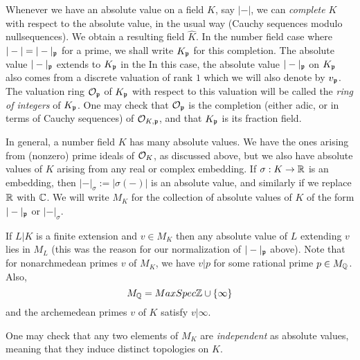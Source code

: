 Whenever we have an absolute value on a field $K$, say $|-|$, we can \emph{complete} $K$ with respect to the absolute value, in the usual way (Cauchy sequences modulo nullsequences).
We obtain a resulting field $\hat K$.
In the number field case where $|-| = |-|_{\mathfrak{p}}$ for a prime, we shall write $K_{\mathfrak{p}}$ for this completion.
The absolute value $|-|_{\mathfrak{p}}$ extends to $K_{\mathfrak{p}}$ in the 
In this case, the absolute value $|-|_{\mathfrak{p}}$ on $K_{\mathfrak{p}}$ also comes from a discrete valuation of rank $1$ which we will also denote by $v_{\mathfrak{p}}$.
The valuation ring $\mathcal{O}_{\mathfrak{p}}$ of $K_{\mathfrak{p}}$ with respect to this valuation will be called the \emph{ring of integers} of $K_{\mathfrak{p}}$.
One may check that $\mathcal{O}_{\mathfrak{p}}$ is the completion (either adic, or in terms of Cauchy sequences) of $\mathcal{O}_{K,\mathfrak{p}}$, and that $K_{\mathfrak{p}}$ is its fraction field.

In general, a number field $K$ has many absolute values.
We have the ones arising from (nonzero) prime ideals of $\mathcal{O}_{K}$, as discussed above, but we also have absolute values of $K$ arising from any real or complex embedding.
If $\sigma : K \to \mathbb{R}$ is an embedding, then $|-|_{\sigma} := |\sigma(-)|$ is an absolute value, and similarly if we replace $\mathbb{R}$ with $\mathbb{C}$.
We will write $M_{K}$ for the collection of absolute values of $K$ of the form $|-|_{\mathfrak{p}}$ or $|-|_{\sigma}$.

If $L|K$ is a finite extension and $v \in M_{K}$ then any absolute value of $L$ extending $v$ lies in $M_{L}$ (this was the reason for our normalization of $|-|_{\mathfrak{p}}$ above).
Note that for nonarchmedean primes $v$ of $M_{K}$, we have $v|p$ for some rational prime $p \in M_{\mathbb{Q}}$.
Also,
\[ M_{\mathbb{Q}} = MaxSpec \mathbb{Z} \cup \{\infty\} \]
and the archemedean primes $v$ of $K$ satisfy $v|\infty$.

One may check that any two elements of $M_{K}$ are \emph{independent} as absolute values, meaning that they induce distinct topologies on $K$.

